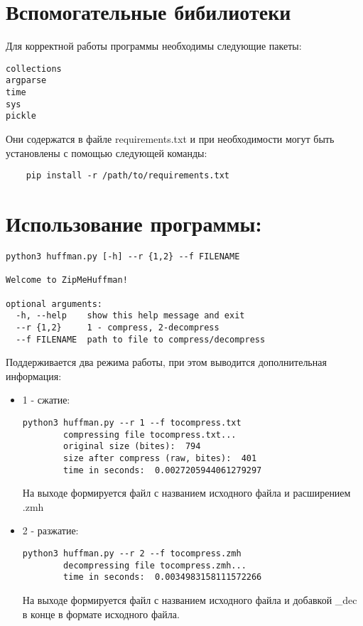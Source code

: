 \section{Вспомогательные бибилиотеки}
Для корректной работы программы необходимы следующие пакеты:

\begin{lstlisting}[numbers=none]
collections
argparse
time
sys
pickle
\end{lstlisting}

Они содержатся в файле requirements.txt и при необходимости могут быть установлены с помощью следующей команды:
\begin{lstlisting}
    pip install -r /path/to/requirements.txt
\end{lstlisting}

\section{Использование программы: }

\begin{lstlisting}[numbers=none]
python3 huffman.py [-h] --r {1,2} --f FILENAME

Welcome to ZipMeHuffman!

optional arguments:
  -h, --help    show this help message and exit
  --r {1,2}     1 - compress, 2-decompress
  --f FILENAME  path to file to compress/decompress
\end{lstlisting}

Поддерживается два режима работы,  при этом выводится дополнительная информация: 
\begin{itemize}
    \item 1 - сжатие: 
    \begin{lstlisting}[numbers=none]
        python3 huffman.py --r 1 --f tocompress.txt   
        compressing file tocompress.txt...
        original size (bites):  794
        size after compress (raw, bites):  401
        time in seconds:  0.0027205944061279297
    \end{lstlisting}
    На выходе формируется файл с названием исходного файла и расширением .zmh
    \item 2 - разжатие:
    \begin{lstlisting}[numbers=none]
        python3 huffman.py --r 2 --f tocompress.zmh
        decompressing file tocompress.zmh...
        time in seconds:  0.0034983158111572266
    \end{lstlisting}
    На выходе формируется файл с названием исходного файла и добавкой \_dec в конце в формате исходного файла.
\end{itemize}

